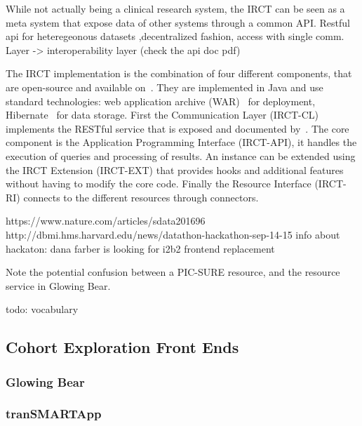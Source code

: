 While not actually being a clinical research system, the IRCT can be seen as a meta system that expose data of other systems through a common API.
Restful api for heteregeonous datasets ,decentralized fashion, access with single comm. Layer -> interoperability layer (check the api doc pdf)

The IRCT implementation is the combination of four different components, that are open-source and available on~\cite{IRCT-github}. They are implemented in Java and use standard technologies: web application archive (WAR)~\cite{wiki:war} for deployment, Hibernate~\cite{wiki:hibernate} for data storage.
First the Communication Layer (IRCT-CL) implements the RESTful service that is exposed and documented by~\cite{PIC-SURE-API}. 
The core component is the Application Programming Interface (IRCT-API), it handles the execution of queries and processing of results.
An instance can be extended using the IRCT Extension (IRCT-EXT) that provides hooks and additional features without having to modify the core code.
Finally the Resource Interface (IRCT-RI) connects to the different resources through connectors.


https://www.nature.com/articles/sdata201696
http://dbmi.hms.harvard.edu/news/datathon-hackathon-sep-14-15
info about hackaton: dana farber is looking for i2b2 frontend replacement 

Note the potential confusion between a PIC-SURE resource, and the resource service in Glowing Bear.

todo: vocabulary


\subsection{Cohort Exploration Front Ends}
\subsubsection{Glowing Bear}

\subsubsection{tranSMARTApp}


